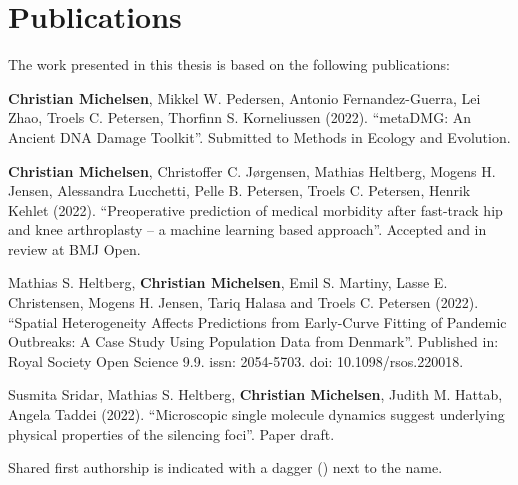 \chapter{Publications}

The work presented in this thesis is based on the following publications:

\vspace{2cm}





\begin{description} [labelindent=1cm,style=multiline,leftmargin=3cm]
	\item [Paper 1:] \textbf{Christian Michelsen}\textsuperscript{\textdagger}, Mikkel W. Pedersen\textsuperscript{\textdagger}, Antonio Fernandez-Guerra, Lei Zhao, Troels C. Petersen, Thorfinn S. Korneliussen (2022). ``metaDMG: An Ancient DNA Damage Toolkit''. Submitted to Methods in Ecology and Evolution. \\
	\item [Paper 2:] \textbf{Christian Michelsen}\textsuperscript{\textdagger}, Christoffer C. Jørgensen\textsuperscript{\textdagger}, Mathias Heltberg, Mogens H. Jensen, Alessandra Lucchetti, Pelle B. Petersen, Troels C. Petersen, Henrik Kehlet (2022). ``Preoperative prediction of medical morbidity after fast-track hip and knee arthroplasty -- a machine learning based approach''. Accepted and in review at BMJ Open. \\
	\item [Paper 3:] Mathias S. Heltberg\textsuperscript{\textdagger}, \textbf{Christian Michelsen}\textsuperscript{\textdagger}, Emil S. Martiny, Lasse E. Christensen, Mogens H. Jensen, Tariq Halasa and Troels C. Petersen (2022). ``Spatial Heterogeneity Affects Predictions from Early-Curve Fitting of Pandemic Outbreaks: A Case Study Using Population Data from Denmark''. Published in: Royal Society Open Science 9.9. issn: 2054-5703. doi: 10.1098/rsos.220018.  \\
	\item [Paper 4:] Susmita Sridar\textsuperscript{\textdagger}, Mathias S. Heltberg\textsuperscript{\textdagger}, \textbf{Christian Michelsen}\textsuperscript{\textdagger}, Judith M. Hattab, Angela Taddei (2022). ``Microscopic single molecule dynamics suggest underlying physical properties of the silencing foci''. Paper draft.
\end{description}


\vspace{1cm}
\noindent Shared first authorship is indicated with a dagger (\textdagger) next to the name.


